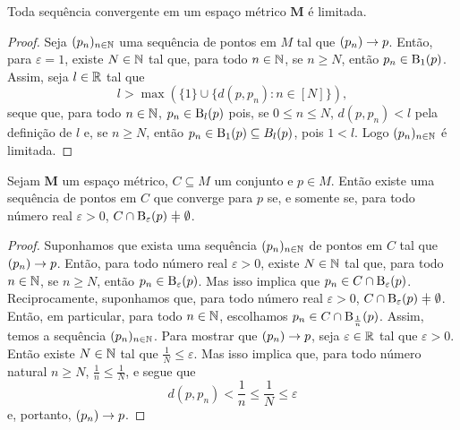 \begin{proposition}
Toda sequência convergente em um espaço métrico $\bm M$ é limitada.
\end{proposition}
\begin{proof}
	Seja $(p_n)_{n \in \mathbb{N}}$ uma sequência de pontos em $M$ tal que $(p_n) \rightarrow p$. Então, para $\varepsilon = 1$, existe $N \in \mathbb{N}$ tal que, para todo $n \in \mathbb{N}$, se $n \geq N$, então $p_n \in \mathrm{B}_1(p)$. Assim, seja $l \in \mathbb{R}$ tal que
	\begin{equation*}
	l > \max(\{1\} \cup \{d(p,p_n) : n \in [N]\}),
	\end{equation*}
seque que, para todo $n \in \mathbb{N}$, $p_n \in \mathrm{B}_l(p)$ pois, se $0 \leq n \leq N$, $d(p,p_n) < l$ pela definição de $l$ e, se $n \geq N$, então $p_n \in \mathrm{B}_1(p) \subseteq B_l(p)$, pois $1 < l$. Logo $(p_n)_{n \in \mathbb{N}}$ é limitada.
\end{proof}

\begin{proposition}
Sejam $\bm M$ um espaço métrico, $C \subseteq M$ um conjunto e $p \in M$. Então existe uma sequência de pontos em $C$ que converge para $p$ se, e somente se, para todo número real $\varepsilon > 0$, $C \cap \bola_\varepsilon(p) \neq \emptyset$.
\end{proposition}
\begin{proof}
	Suponhamos que exista uma sequência $(p_n)_{n \in \mathbb{N}}$ de pontos em $C$ tal que $(p_n) \rightarrow p$. Então, para todo número real $\varepsilon > 0$, existe $N \in \mathbb{N}$ tal que, para todo $n \in \mathbb{N}$, se $n \geq N$, então $p_n \in \mathrm{B}_\varepsilon(p)$. Mas isso implica que $p_n \in C \cap \mathrm{B}_\varepsilon(p)$. Reciprocamente, suponhamos que, para todo número real $\varepsilon > 0$, $C \cap \bola_\varepsilon(p) \neq \emptyset$. Então, em particular, para todo $n \in \mathbb{N}$, escolhamos $p_n \in C \cap \mathrm{B}_{\frac{1}{n}}(p)$. Assim, temos a sequência $(p_n)_{n \in \mathbb{N}}$. Para mostrar que $(p_n) \rightarrow p$, seja $\varepsilon \in \mathbb{R}$ tal que $\varepsilon > 0$. Então existe $N \in \mathbb{N}$ tal que $\frac{1}{N} \leq \varepsilon$. Mas isso implica que, para todo número natural $n \geq N$, $\frac{1}{n} \leq \frac{1}{N}$, e segue que
	\begin{equation*}
	d(p,p_n) < \frac{1}{n} \leq \frac{1}{N} \leq \varepsilon
	\end{equation*}
e, portanto, $(p_n) \rightarrow p$.
\end{proof}

